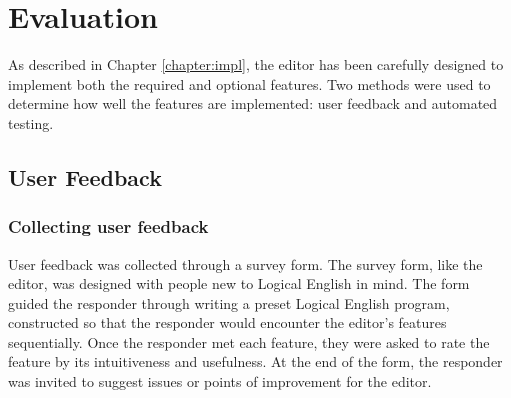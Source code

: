 \documentclass[../main.tex]{subfiles}
\begin{document}
\chapter{Evaluation}
As described in Chapter \ref{chapter:impl}, the editor has been carefully designed to implement both the required and optional features. Two methods were used to determine how well the features are implemented: user feedback and automated testing.

\section{User Feedback}
\subsection{Collecting user feedback}
User feedback was collected through a survey form. The survey form, like the editor, was designed with people new to Logical English in mind. The form guided the responder through writing a preset Logical English program, constructed so that the responder would encounter the editor's features sequentially. Once the responder met each feature, they were asked to rate the feature by its intuitiveness and usefulness. At the end of the form, the responder was invited to suggest issues or points of improvement for the editor.
\end{document}
